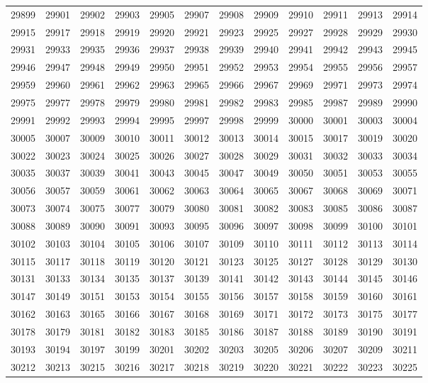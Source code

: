 \begin{center}
\begin{longtable}{llllllllllll}
29899 &29901 &29902 &29903 &29905 &29907 &29908 &29909 &29910 &29911 &29913 &29914 \\
29915 &29917 &29918 &29919 &29920 &29921 &29923 &29925 &29927 &29928 &29929 &29930 \\
29931 &29933 &29935 &29936 &29937 &29938 &29939 &29940 &29941 &29942 &29943 &29945 \\
29946 &29947 &29948 &29949 &29950 &29951 &29952 &29953 &29954 &29955 &29956 &29957 \\
29959 &29960 &29961 &29962 &29963 &29965 &29966 &29967 &29969 &29971 &29973 &29974 \\
29975 &29977 &29978 &29979 &29980 &29981 &29982 &29983 &29985 &29987 &29989 &29990 \\
29991 &29992 &29993 &29994 &29995 &29997 &29998 &29999 &30000 &30001 &30003 &30004 \\
30005 &30007 &30009 &30010 &30011 &30012 &30013 &30014 &30015 &30017 &30019 &30020 \\
30022 &30023 &30024 &30025 &30026 &30027 &30028 &30029 &30031 &30032 &30033 &30034 \\
30035 &30037 &30039 &30041 &30043 &30045 &30047 &30049 &30050 &30051 &30053 &30055 \\
30056 &30057 &30059 &30061 &30062 &30063 &30064 &30065 &30067 &30068 &30069 &30071 \\
30073 &30074 &30075 &30077 &30079 &30080 &30081 &30082 &30083 &30085 &30086 &30087 \\
30088 &30089 &30090 &30091 &30093 &30095 &30096 &30097 &30098 &30099 &30100 &30101 \\
30102 &30103 &30104 &30105 &30106 &30107 &30109 &30110 &30111 &30112 &30113 &30114 \\
30115 &30117 &30118 &30119 &30120 &30121 &30123 &30125 &30127 &30128 &30129 &30130 \\
30131 &30133 &30134 &30135 &30137 &30139 &30141 &30142 &30143 &30144 &30145 &30146 \\
30147 &30149 &30151 &30153 &30154 &30155 &30156 &30157 &30158 &30159 &30160 &30161 \\
30162 &30163 &30165 &30166 &30167 &30168 &30169 &30171 &30172 &30173 &30175 &30177 \\
30178 &30179 &30181 &30182 &30183 &30185 &30186 &30187 &30188 &30189 &30190 &30191 \\
30193 &30194 &30197 &30199 &30201 &30202 &30203 &30205 &30206 &30207 &30209 &30211 \\
30212 &30213 &30215 &30216 &30217 &30218 &30219 &30220 &30221 &30222 &30223 &30225 \\

\end{longtable}
\end{center}
